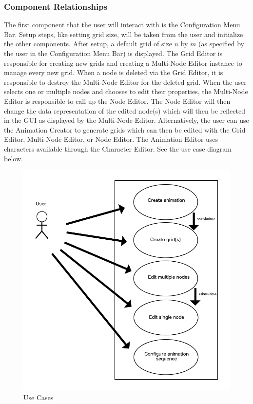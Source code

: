 \documentclass[12pt]{article}
\begin{document}
	\subsubsection{Component Relationships}
  	The first component that the user will interact with is the Configuration Menu Bar. Setup steps, like setting grid size, will be taken from the user and initialize the other components.	
  	After setup, a default grid of size $n$ by $m$ (as specified by the user in the Configuration Menu Bar) is displayed. The Grid Editor is responsible for creating new grids and creating a Multi-Node Editor instance to manage every new grid. When a node is deleted via the Grid Editor, it is responsible to destroy the Multi-Node Editor for the deleted grid.  	
  	When the user selects one or multiple nodes and chooses to edit their properties, the Multi-Node Editor is responsible to call up the Node Editor. The Node Editor will then change the data representation of the edited node(s) which will then be reflected in the GUI as displayed by the Multi-Node Editor.  	
  	Alternatively, the user can use the Animation Creator to generate grids which can then be edited with the Grid Editor, Multi-Node Editor, or Node Editor. The Animation Editor uses characters available through the Character Editor.  	
  	See the use case diagram below.	
  	\begin{figure}[ht!]
  		\centering
  		\includegraphics[width=0.9\linewidth]{Relationship_Use.png}
  		\caption{Use Cases}
  	\end{figure}
	\clearpage	
\newpage
\end{document}
